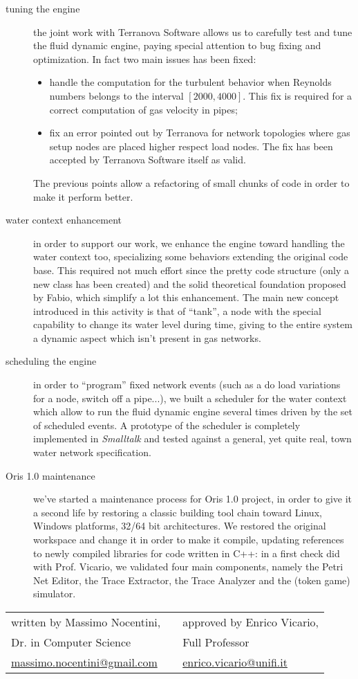 \documentclass[twoside,openright,titlepage,fleqn,
headinclude,11pt,a4paper,BCOR5mm,footinclude ]{scrbook}
\begin{document}
\begin{description}
\item[tuning the engine] the joint work with Terranova Software allows
  us to carefully test and tune the fluid dynamic engine, paying
  special attention to bug fixing and optimization. In fact two main
  issues has been fixed:
  \begin{itemize}
    \item handle the computation for the turbulent behavior when
      Reynolds numbers belongs to the interval $[2000, 4000]$. This
      fix is required for a correct computation of gas velocity in
      pipes;
    \item fix an error pointed out by Terranova for network topologies
      where gas setup nodes are placed higher respect load nodes. The
      fix has been accepted by Terranova Software itself as valid.
  \end{itemize}
  The previous points allow a refactoring of small chunks of code in
  order to make it perform better.
  
\item[water context enhancement] in order to support our work, we
  enhance the engine toward handling the water context too,
  specializing some behaviors extending the original code base. This
  required not much effort since the pretty code structure (only a new
  class has been created) and the solid theoretical foundation
  proposed by Fabio, which simplify a lot this enhancement.  The main
  new concept introduced in this activity is that of ``tank'', a node
  with the special capability to change its water level during time,
  giving to the entire system a dynamic aspect which isn't present in
  gas networks.
  \newpage
\item[scheduling the engine] in order to ``program'' fixed network
  events (such as a do load variations for a node, switch off a
  pipe...), we built a scheduler for the water context which allow to
  run the fluid dynamic engine several times driven by the set of
  scheduled events. A prototype of the scheduler is completely
  implemented in \emph{Smalltalk} and tested against a general, yet
  quite real, town water network specification.
  
\item[Oris 1.0 maintenance] we've started a maintenance process for
  Oris 1.0 project, in order to give it a second life by restoring a
  classic building tool chain toward Linux, Windows platforms, 32/64
  bit architectures. We restored the original workspace and change it
  in order to make it compile, updating references to newly compiled
  libraries for code written in C++: in a first check did with
  Prof. Vicario, we validated four main components, namely the Petri Net
  Editor, the Trace Extractor, the Trace Analyzer and the (token game)
  simulator.
\end{description}

\begin{tabular}{ l c l }
  written by Massimo Nocentini,  &  & approved by Enrico Vicario,  \\
  Dr. in Computer Science & & Full Professor \\
  \url{massimo.nocentini@gmail.com} &  & \url{enrico.vicario@unifi.it} \\
\end{tabular}
\end{document}
